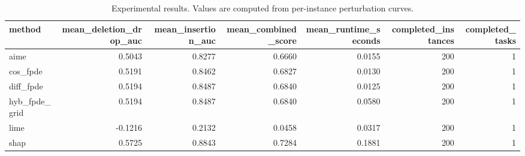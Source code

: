\begin{table}[t]
\caption{Experimental results. Values are computed from per-instance perturbation curves.}
\label{tab:main_results_computed}
\centering
\begin{tabular}{lrrrrrr}
\toprule
method & mean\_deletion\_drop\_auc & mean\_insertion\_auc & mean\_combined\_score & mean\_runtime\_seconds & completed\_instances & completed\_tasks \\
\midrule
aime & 0.5043 & 0.8277 & 0.6660 & 0.0155 & 200 & 1 \\
cos\_fpde & 0.5191 & 0.8462 & 0.6827 & 0.0130 & 200 & 1 \\
diff\_fpde & 0.5194 & 0.8487 & 0.6840 & 0.0125 & 200 & 1 \\
hyb\_fpde\_grid & 0.5194 & 0.8487 & 0.6840 & 0.0580 & 200 & 1 \\
lime & -0.1216 & 0.2132 & 0.0458 & 0.0317 & 200 & 1 \\
shap & 0.5725 & 0.8843 & 0.7284 & 0.1881 & 200 & 1 \\
\bottomrule
\end{tabular}

\end{table}
